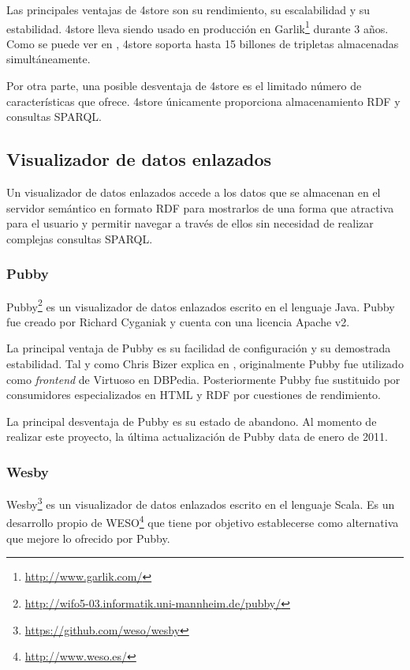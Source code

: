 Las principales ventajas de 4store son su rendimiento, su escalabilidad y su estabilidad. 4store lleva siendo usado en producción en Garlik\footnote{\url{http://www.garlik.com/}} durante 3 años. Como se puede ver en \cite[]{largetriplestores}, 4store soporta hasta 15 billones de tripletas almacenadas simultáneamente.

Por otra parte, una posible desventaja de 4store es el limitado número de características que ofrece. 4store únicamente proporciona almacenamiento RDF y consultas SPARQL.



\subsection{Visualizador de datos enlazados}
Un visualizador de datos enlazados accede a los datos que se almacenan en el servidor semántico en formato RDF para mostrarlos de una forma que atractiva para el usuario y permitir navegar a través de ellos sin necesidad de realizar complejas consultas SPARQL.


\subsubsection{Pubby}
Pubby\footnote{\url{http://wifo5-03.informatik.uni-mannheim.de/pubby/}} es un visualizador de datos enlazados escrito en el lenguaje Java.  Pubby fue creado por Richard Cyganiak y cuenta con una licencia Apache v2.

La principal ventaja de Pubby es su facilidad de configuración y su demostrada estabilidad. Tal y como Chris Bizer explica en \cite[]{dbpedia-architecture}, originalmente Pubby fue utilizado como \textit{frontend} de Virtuoso en DBPedia.  Posteriormente Pubby fue sustituido por consumidores especializados en HTML y RDF por cuestiones de rendimiento.

La principal desventaja de Pubby es su estado de abandono. Al momento de realizar este proyecto, la última actualización de Pubby data de enero de 2011.

\subsubsection{Wesby}
Wesby\footnote{\url{https://github.com/weso/wesby}} es un visualizador de datos enlazados escrito en el lenguaje Scala. Es un desarrollo propio de WESO\footnote{\url{http://www.weso.es/}} que tiene por objetivo establecerse como alternativa que mejore lo ofrecido por Pubby.

